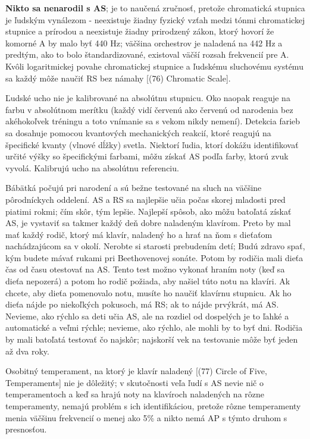\documentclass[11pt,a4paper]{book}
\begin{document}
\textbf{Nikto sa nenarodil s AS}; je to naučená zručnosť, pretože chromatická stupnica je ľudským vynálezom - neexistuje žiadny fyzický vzťah medzi tónmi chromatickej stupnice a prírodou a neexistuje žiadny prirodzený zákon, ktorý hovorí že komorné A by malo byť 440 Hz; väčšina orchestrov je naladená na 442 Hz a predtým, ako to bolo štandardizované, existoval väčší rozsah frekvencií pre A. Kvôli logaritmickej povahe chromatickej stupnice a ľudskému sluchovému systému sa každý môže naučiť RS bez námahy [(76) Chromatic Scale].

Ľudské ucho nie je kalibrované na absolútnu stupnicu. Oko naopak reaguje na farbu v absolútnom merítku (každý vidí červenú ako červenú od narodenia bez akéhokoľvek tréningu a toto vnímanie sa s vekom nikdy nemení). Detekcia farieb sa dosahuje pomocou kvantových mechanických reakcií, ktoré reagujú na špecifické kvanty (vlnové dĺžky) svetla. Niektorí ľudia, ktorí dokážu identifikovať určité výšky so špecifickými farbami, môžu získať AS podľa farby, ktorú zvuk vyvolá. Kalibrujú ucho na absolútnu referenciu.

Bábätká počujú pri narodení a sú bežne testované na sluch na väčšine pôrodníckych oddelení. AS a RS sa najlepšie učia počas skorej mladosti pred piatimi rokmi; čím skôr, tým lepšie. Najlepší spôsob, ako môžu batoľatá získať AS, je vystaviť sa takmer každý deň dobre naladeným klavírom. Preto by mal mať každý rodič, ktorý má klavír, naladený ho a hrať na ňom s dieťaťom nachádzajúcom sa v okolí. Nerobte si starosti prebudením detí; Budú zdravo spať, kým budete mávať rukami pri Beethovenovej sonáte. Potom by rodičia mali dieťa čas od času otestovať na AS. Tento test možno vykonať hraním noty (keď sa dieťa nepozerá) a potom ho rodič požiada, aby našiel túto notu na klavíri. Ak chcete, aby dieťa pomenovalo notu, musíte ho naučiť klavírnu stupnicu. Ak ho dieťa nájde po niekoľkých pokusoch, má RS; ak to nájde prvýkrát, má AS. Nevieme, ako rýchlo sa deti učia AS, ale na rozdiel od dospelých je to ľahké a automatické a veľmi rýchle; nevieme, ako rýchlo, ale mohli by to byť dni. Rodičia by mali batoľatá testovať čo najskôr; najskorší vek na testovanie môže byť jeden až dva roky.

Osobitný temperament, na ktorý je klavír naladený [(77) Circle of Five, Temperaments] nie je dôležitý; v skutočnosti veľa ľudí s AS nevie nič o temperamentoch a keď sa hrajú noty na klavíroch naladených na rôzne temperamenty, nemajú problém s ich identifikáciou, pretože rôzne temperamenty menia väčšinu frekvencií o menej ako 5\% a nikto nemá AP s týmto druhom s presnosťou.
\end{document}
